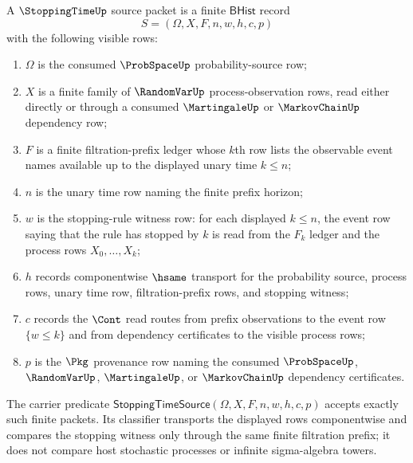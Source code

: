 \begin{definition}
\label{def:stoppingtime-source-packet}
A $\StoppingTimeUp$ source packet is a finite $\mathsf{BHist}$ record
$$
S=(\Omega,X,F,n,w,h,c,p)
$$
with the following visible rows:
\begin{enumerate}
\item $\Omega$ is the consumed $\ProbSpaceUp$ probability-source row;
\item $X$ is a finite family of $\RandomVarUp$ process-observation rows, read
either directly or through a consumed $\MartingaleUp$ or $\MarkovChainUp$
dependency row;
\item $F$ is a finite filtration-prefix ledger whose $k$th row lists the
observable event names available up to the displayed unary time $k\leq n$;
\item $n$ is the unary time row naming the finite prefix horizon;
\item $w$ is the stopping-rule witness row: for each displayed $k\leq n$, the
event row saying that the rule has stopped by $k$ is read from the $F_k$
ledger and the process rows $X_0,\ldots,X_k$;
\item $h$ records componentwise $\hsame$ transport for the probability source,
process rows, unary time row, filtration-prefix rows, and stopping witness;
\item $c$ records the $\Cont$ read routes from prefix observations to the
event row $\{w\leq k\}$ and from dependency certificates to the visible
process rows;
\item $p$ is the $\Pkg$ provenance row naming the consumed $\ProbSpaceUp$,
$\RandomVarUp$, $\MartingaleUp$, or $\MarkovChainUp$ dependency certificates.
\end{enumerate}
The carrier predicate
$\mathsf{StoppingTimeSource}(\Omega,X,F,n,w,h,c,p)$ accepts exactly such
finite packets. Its classifier transports the displayed rows componentwise
and compares the stopping witness only through the same finite filtration
prefix; it does not compare host stochastic processes or infinite
sigma-algebra towers.
\end{definition}

